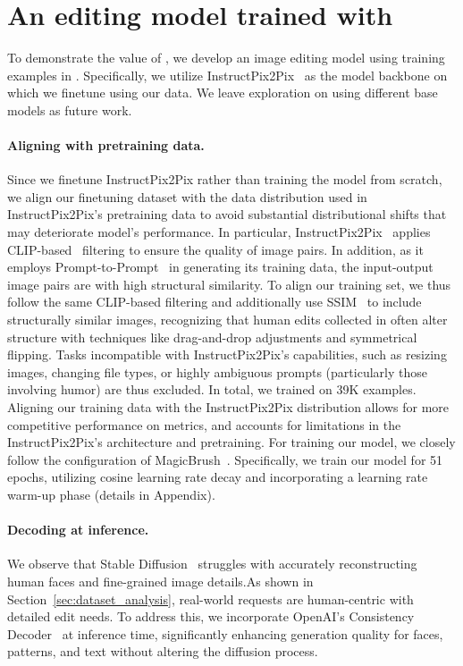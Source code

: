 \section{An editing model trained with \RealEdit}
To demonstrate the value of \RealEdit, we develop an image editing model using training examples in \RealEdit.
Specifically, we utilize InstructPix2Pix~\cite{brooks2023instructpix2pix} as the model backbone on which we finetune using our data.
We leave exploration on using different base models as future work.



\paragraph{Aligning with pretraining data.}
Since we finetune InstructPix2Pix rather than training the model from scratch, we align our finetuning dataset with the data distribution used in InstructPix2Pix's pretraining data to avoid substantial distributional shifts that may deteriorate model's performance.
In particular, InstructPix2Pix~\cite{brooks2023instructpix2pix} applies CLIP-based~\cite{radford2021learning} filtering to ensure the quality of image pairs. In addition, as it employs Prompt-to-Prompt~\cite{hertz2022prompt} in generating its training data, the input-output image pairs are with high structural similarity.
To align our training set, we thus follow the same CLIP-based filtering and additionally use SSIM~\cite{wang2004image} to include structurally similar images, recognizing that human edits collected in \RealEdit often alter structure with techniques like drag-and-drop adjustments and symmetrical flipping.
Tasks incompatible with InstructPix2Pix’s capabilities, such as resizing images, changing file types, or highly ambiguous prompts (particularly those involving humor) are thus excluded.
In total, we trained on 39K examples.
Aligning our training data with the InstructPix2Pix distribution allows for more competitive performance on metrics, and accounts for limitations in the InstructPix2Pix's architecture and pretraining.
For training our model, we closely follow the configuration of MagicBrush~\cite{zhang2024magicbrush}. Specifically, we train our model for 51 epochs, utilizing cosine learning rate decay and incorporating a learning rate warm-up phase (details in Appendix).
\paragraph{Decoding at inference.}
We observe that Stable Diffusion~\cite{rombach2022high} struggles with accurately reconstructing human faces and fine-grained image details.As shown in Section~\ref{sec:dataset_analysis}, real-world requests are human-centric with detailed edit needs. To address this, we incorporate OpenAI's Consistency Decoder~\cite{openai_consistencydecoder} at inference time, significantly enhancing generation quality for faces, patterns, and text without altering the diffusion process.

